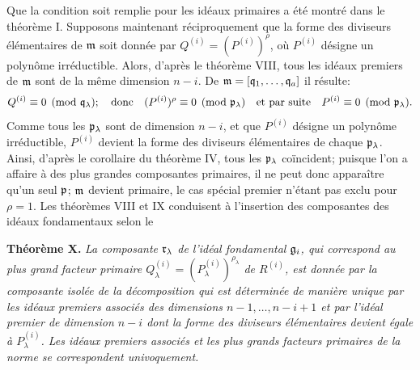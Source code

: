 Que la condition soit remplie pour les idéaux primaires a été montré dans le théorème I. Supposons maintenant réciproquement que la forme des diviseurs élémentaires de $\mathfrak m$ soit donnée par $Q^{(i)}=(P^{(i)})^\rho$, où $P^{(i)}$ désigne un polynôme irréductible. Alors, d'après le théorème VIII, tous les idéaux premiers de $\mathfrak m$ sont de la même dimension $n-i$. De $\mathfrak m=[\mathfrak q_1,\ldots,\mathfrak q_a]$ il résulte:
\[
 Q^{(i)}\equiv0\pmod{\mathfrak q_\lambda};\quad\hbox{donc}\quad
 (P^{(i)})^\rho\equiv0\pmod{\mathfrak p_\lambda}\quad\hbox{et par suite}\quad
 P^{(i)}\equiv0\pmod{\mathfrak p_\lambda}.
\]
Comme tous les $\mathfrak p_\lambda$ sont de dimension $n-i$, et que $P^{(i)}$ désigne un polynôme irréductible, $P^{(i)}$ devient la forme des diviseurs élémentaires de chaque $\mathfrak p_\lambda$. Ainsi, d'après le corollaire du théorème IV, tous les $\mathfrak p_\lambda$ coïncident; puisque l'on a affaire à des plus grandes composantes primaires, il ne peut donc apparaître qu'un seul $\mathfrak p$; $\mathfrak m$ devient primaire, le cas spécial premier n'étant pas exclu pour $\rho=1$. Les théorèmes VIII et IX conduisent à l'insertion des composantes des idéaux fondamentaux selon le

\textbf{Théorème X.} \emph{La composante $\mathfrak r_\lambda$ de l'idéal fondamental $\mathfrak g_i$, qui correspond au plus grand facteur primaire $Q_\lambda^{(i)}=(P_\lambda^{(i)})^{\rho_\lambda}$ de $R^{(i)}$, est donnée par la composante isolée de la décomposition qui est déterminée de manière unique par les idéaux premiers associés des dimensions $n-1,\ldots,n-i+1$ et par l'idéal premier de dimension $n-i$ dont la forme des diviseurs élémentaires devient égale à $P_\lambda^{(i)}$. Les idéaux premiers associés et les plus grands facteurs primaires de la norme se correspondent univoquement.}

